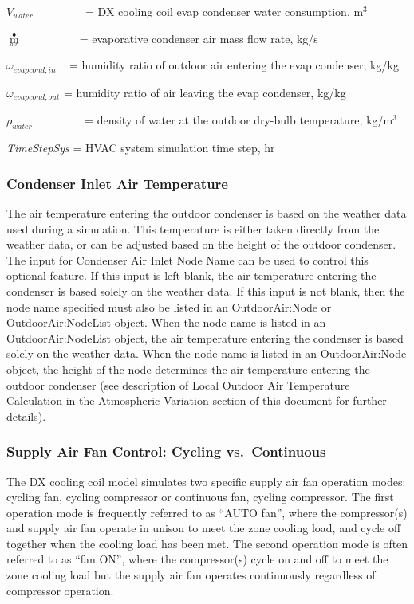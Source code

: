 \({V_{water}}\) ~~~~~~~~ = DX cooling coil evap condenser water consumption, m\(^{3}\)

\({\mathop m\limits^ \bullet_{_{air}}}\) ~~~~~~~~~ = evaporative condenser air mass flow rate, kg/s

\({\omega_{evapcond,in}}\) ~ = humidity ratio of outdoor air entering the evap condenser, kg/kg

\({\omega_{evapcond,out}}\) = humidity ratio of air leaving the evap condenser, kg/kg

\({\rho_{water}}\) ~~~~~~~~ = density of water at the outdoor dry-bulb temperature, kg/m\(^{3}\)

\emph{TimeStepSys} = HVAC system simulation time step, hr

\subsubsection{Condenser Inlet Air Temperature}\label{condenser-inlet-air-temperature}

The air temperature entering the outdoor condenser is based on the weather data used during a simulation. This temperature is either taken directly from the weather data, or can be adjusted based on the height of the outdoor condenser. The input for Condenser Air Inlet Node Name can be used to control this optional feature. If this input is left blank, the air temperature entering the condenser is based solely on the weather data. If this input is not blank, then the node name specified must also be listed in an OutdoorAir:Node or OutdoorAir:NodeList object. When the node name is listed in an OutdoorAir:NodeList object, the air temperature entering the condenser is based solely on the weather data. When the node name is listed in an OutdoorAir:Node object, the height of the node determines the air temperature entering the outdoor condenser (see description of Local Outdoor Air Temperature Calculation in the Atmospheric Variation section of this document for further details).

\subsubsection{Supply Air Fan Control: Cycling vs.~Continuous}\label{supply-air-fan-control-cycling-vs.continuous}

The DX cooling coil model simulates two specific supply air fan operation modes: cycling fan, cycling compressor or continuous fan, cycling compressor. The first operation mode is frequently referred to as ``AUTO fan'', where the compressor(s) and supply air fan operate in unison to meet the zone cooling load, and cycle off together when the cooling load has been met. The second operation mode is often referred to as ``fan ON'', where the compressor(s) cycle on and off to meet the zone cooling load but the supply air fan operates continuously regardless of compressor operation.

